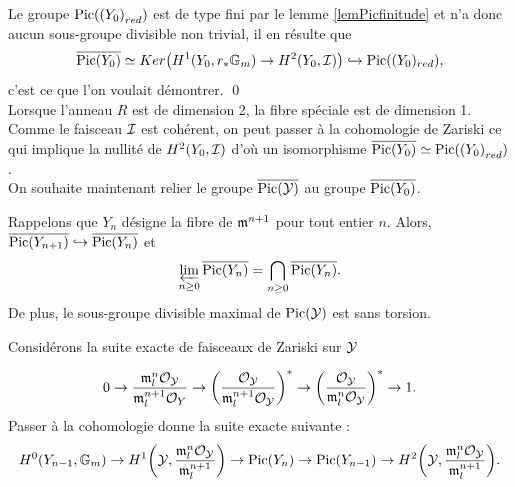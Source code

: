 \documentclass[11pt]{article}
\begin{document}
Le groupe $\operatorname{Pic}({(Y_0)}_{red})$ est de type fini par le lemme \ref{lemPicfinitude} et n'a donc aucun sous-groupe divisible non trivial, il en résulte que
$$
\overline{\operatorname{Pic}(Y_0)} \simeq Ker\big({H^1(Y_0, {r}_*\mathbb{G}_{m})} \rightarrow H^2(Y_0,\mathcal{I}) \big) \hookrightarrow \operatorname{Pic}((Y_0)_{red}),
$$
c'est ce que l'on voulait démontrer.
\qed
\\

\rmke Lorsque l'anneau $R$ est de dimension 2, la fibre spéciale est de dimension 1. Comme le faisceau $\mathcal{I}$ est cohérent, on peut passer à la cohomologie de Zariski ce qui implique la nullité de $H^2(Y_0,\mathcal{I})$ d'où un isomorphisme $\overline{\operatorname{Pic}(Y_0)} \simeq \operatorname{Pic}({(Y_0)}_{red})$.\\

On souhaite maintenant relier le groupe $\overline{\operatorname{Pic}(\mathcal{Y})}$ au groupe $\overline{\operatorname{Pic}(Y_0)}$.


\begin{lemme}\label{PicYn} Rappelons que $Y_n$ désigne la fibre de $\mathfrak{m}^{n+1}$ pour tout entier $n$.
Alors, $\overline{\operatorname{Pic}(Y_{n+1})} \hookrightarrow \overline{\operatorname{Pic}(Y_n)}$ et
$$\varprojlim_{n \geq 0} \overline{\operatorname{Pic}(Y_n)} = \bigcap_{n \geq 0} \overline{\operatorname{Pic}(Y_n)}.$$
De plus, le sous-groupe divisible maximal de $\operatorname{Pic}(\mathcal{Y})$ est sans torsion.
\end{lemme}

\proof  Considérons la suite exacte de faisceaux de Zariski sur $\mathcal{Y}$ 

$$ 0 \rightarrow \frac{\mathfrak{m}^n_l \mathcal{O}_{\mathcal{Y}} }{\mathfrak{m}^{n+1}_l \mathcal{O}_Y} \rightarrow \bigg(\frac{\mathcal{O}_{\mathcal{Y}} }{\mathfrak{m}^{n+1}_l \mathcal{O}_{\mathcal{Y}}}\bigg)^* \rightarrow \bigg(\frac{\mathcal{O}_{\mathcal{Y}} }{\mathfrak{m}^{n}_l \mathcal{O}_{\mathcal{Y}}}\bigg)^* \rightarrow 1.$$
Passer à la cohomologie donne la suite exacte suivante :
\begin{equation}\label{suiteexactePic}
 H^0(Y_{n-1}, \mathbb{G}_m) \rightarrow H^1\bigg(\mathcal{Y},\frac{\mathfrak{m}^n_l \mathcal{O}_{\mathcal{Y}} }{\mathfrak{m}^{n+1}_l}\bigg) \rightarrow \operatorname{Pic}(Y_n) \rightarrow \operatorname{Pic}(Y_{n-1}) \rightarrow H^2\bigg(\mathcal{Y},\frac{\mathfrak{m}^n_l \mathcal{O}_{\mathcal{Y}} }{\mathfrak{m}^{n+1}_l}\bigg).
\end{equation}
\end{document}
